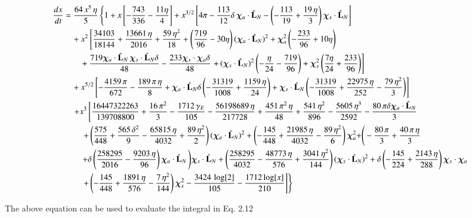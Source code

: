 \documentclass[prd,preprintnumbers,twocolumn,eqsecnum,floatfix,letter]{revtex4}
\begin{document}
\begin{widetext}
	\begin{align}\label{eq:FbydE}
	\frac{dx}{dt} & = \frac{64\, x^5  \, \eta}{5} \left\{1 + x \left[-\frac{743}{336}-\frac{11 \eta }{4} \right] 
	+ x^{3/2} \left[4 \pi-\frac{113}{12}\delta \, \bm{\chi}_a \cdot \hat{\mathbf{L}}_N- \left(-\frac{113}{19} + \frac{19 \, \eta}{3}  \right)\bm{\chi}_s \cdot \hat{\mathbf{L}}_N \right] \right. \nonumber \\ 
	&\quad + x^2 \left[ \frac{34103}{18144} + \frac{13661 \, \eta}{2016} + \frac{59 \, \eta^2}{18} + \left( \frac{719}{96}- 30 \eta\right)(\bm{\chi}_a \cdot \hat{\mathbf{L}}_N)^2 +\bm{\chi}_a^2 \left(-\frac{233}{96}+10 \eta \right) \right. \nonumber\\
	&\qquad+\frac{719 \bm{\chi}_a \cdot \hat{\mathbf{L}}_N \, \bm{\chi}_s \cdot \hat{\mathbf{L}}_N \delta
	}{48}-\frac{233 \bm{\chi}_s \cdot \bm{\chi}_a \delta}{48} \left. + \, (\bm{\chi}_s \cdot \hat{\mathbf{L}}_N)^2 \left(-\frac{\eta }{24}-\frac{719}{96}\right)+\bm{\chi}_s^2 \left(\frac{7 \eta
}{24}+\frac{233}{96}\right) \right] \nonumber \\ 
&\quad + x^{5/2} \left[-\frac{4159 \, \pi}{672}-\frac{189 \, \pi \, \eta}{8} + \bm{\chi}_a \cdot \hat{\mathbf{L}}_N \delta  \left(-\frac{31319}{1008} + \frac{1159 \, \eta}{24}\right)+\bm{\chi}_s \cdot \hat{\mathbf{L}}_N \left(-\frac{31319}{1008} + \frac{22975 \, \eta}{252} -\frac{79 \, \eta^2}{3}\right) \right]  \nonumber\\ 
&\quad \left. + x^3 \left[\frac{16447322263}{139708800} + \frac{16 \, \pi^2}{3} -\frac{1712 \, \gamma_{E}}{105} -\frac{56198689 \, \eta}{217728} + \frac{451 \, \pi^2 \, \eta}{48} + \frac{541 \, \eta^2}{896} -\frac{5605 \, \eta^{3}}{2592} -\frac{80 \,\pi \delta\bm{\chi}_a \cdot \hat{\mathbf{L}}_N }{3} \right.\right. \nonumber \\
&\qquad \left.\left. + \left(\frac{575}{448} + \frac{565 \, \delta^2}{9}-\frac{65815 \, \eta}{4032} + \frac{89 \, \eta^2}{2}\right)(\bm{\chi}_a \cdot \hat{\mathbf{L}}_N)^2 + \left(-\frac{145}{448}+\frac{21985 \,\eta}{4032} -\frac{89 \, \eta^2}{6}\right)\bm{\chi}_a^2 + \right(-\frac{80 \, \pi}{3} + \frac{40 \, \pi \, \eta}{3} \right. \nonumber \\
&\qquad  \left.+\delta\left(\frac{258295}{2016} -\frac{9203 \, \eta}{96}\right)\bm{\chi}_a \cdot \hat{\mathbf{L}}_N\left)\bm{\chi}_s \cdot \hat{\mathbf{L}}_N + \left(\frac{258295}{4032} -\frac{48773 \, \eta}{576} + \frac{3041 \, \eta^2}{144}\right)(\bm{\chi}_s \cdot \hat{\mathbf{L}}_N)^2 + \delta\left(-\frac{145}{224} + \frac{2143 \, \eta}{288}\right)\bm{\chi}_s \cdot \bm{\chi}_a \right.\right.\nonumber \\ 
&\qquad\left.\left.+\left(-\frac{145}{448} + \frac{1891 \, \eta}{576} -\frac{7 \, \eta^2}{144}\right)\bm{\chi}_s^2 - \frac{3424 \, \log[2]}{105} - \frac{1712 \log[x]}{210}\right]\right\}
\end{align}
\end{widetext}
The above equation can be used to evaluate the integral in Eq. 2.12
\end{document}
